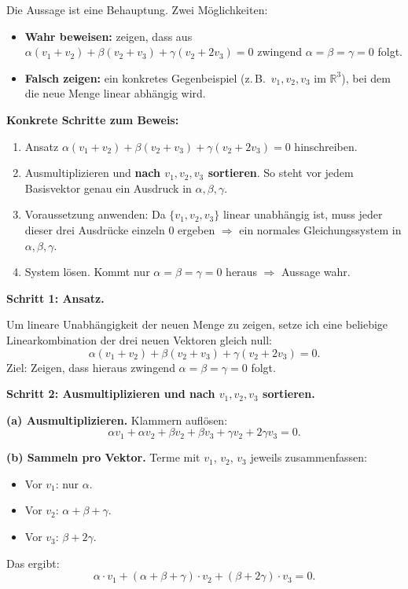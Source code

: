 \documentclass[a4paper,12pt]{article}
\begin{document}
\begin{wastun}
Die Aussage ist eine Behauptung. Zwei M\"oglichkeiten:
\begin{itemize}[leftmargin=*, nosep]
    \item \textbf{Wahr beweisen:} zeigen, dass aus $\alpha(v_1+v_2) + \beta(v_2+v_3) + \gamma(v_2+2v_3) = 0$ zwingend $\alpha = \beta = \gamma = 0$ folgt.
    \item \textbf{Falsch zeigen:} ein konkretes Gegenbeispiel (z.\,B.\ $v_1, v_2, v_3$ im $\mathbb{R}^3$), bei dem die neue Menge linear abh\"angig wird.
\end{itemize}

\medskip
\textbf{Konkrete Schritte zum Beweis:}
\begin{enumerate}[leftmargin=*, nosep]
    \item Ansatz $\alpha(v_1+v_2) + \beta(v_2+v_3) + \gamma(v_2+2v_3) = 0$ hinschreiben.
    \item Ausmultiplizieren und \textbf{nach $v_1, v_2, v_3$ sortieren}. So steht vor jedem Basisvektor genau ein Ausdruck in $\alpha, \beta, \gamma$.
    \item Voraussetzung anwenden: Da $\{v_1, v_2, v_3\}$ linear unabh\"angig ist, muss jeder dieser drei Ausdr\"ucke einzeln $0$ ergeben $\Rightarrow$ ein normales Gleichungssystem in $\alpha, \beta, \gamma$.
    \item System l\"osen. Kommt nur $\alpha = \beta = \gamma = 0$ heraus $\Rightarrow$ Aussage wahr.
\end{enumerate}
\end{wastun}

\medskip

\textbf{Schritt 1: Ansatz.}

Um lineare Unabh\"angigkeit der neuen Menge zu zeigen, setze ich
eine beliebige Linearkombination der drei neuen Vektoren gleich null:
\[
\alpha(v_1+v_2) + \beta(v_2+v_3) + \gamma(v_2+2v_3) = 0.
\]
Ziel: Zeigen, dass hieraus zwingend $\alpha = \beta = \gamma = 0$ folgt.

\textbf{Schritt 2: Ausmultiplizieren und nach $v_1, v_2, v_3$ sortieren.}

\textbf{(a) Ausmultiplizieren.} Klammern aufl\"osen:
\[
\alpha v_1 + \alpha v_2 + \beta v_2 + \beta v_3 + \gamma v_2 + 2\gamma v_3 = 0.
\]

\textbf{(b) Sammeln pro Vektor.} Terme mit $v_1$, $v_2$, $v_3$ jeweils zusammenfassen:
\begin{itemize}[leftmargin=*, nosep]
    \item Vor $v_1$: nur $\alpha$.
    \item Vor $v_2$: $\alpha + \beta + \gamma$.
    \item Vor $v_3$: $\beta + 2\gamma$.
\end{itemize}
Das ergibt:
\[
\alpha \cdot v_1 + (\alpha + \beta + \gamma) \cdot v_2 + (\beta + 2\gamma) \cdot v_3 = 0.
\]
\end{document}
